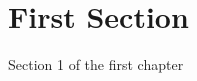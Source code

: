 \section{First Section}
Section 1 of the first chapter \cite{exemplochapter2sec1} \cite{artigo2024chapter2sec1}

\printbibliography[heading=subbibliography, title={Referências da Seção 2.1}, keyword=chapter2secao1]